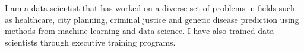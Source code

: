 

\begin{cvparagraph}

I am a data scientist that has worked on a diverse set of problems in fields such as healthcare, city planning, criminal justice
   and genetic disease prediction using methods from machine learning and data science. I have also trained data scientists through executive training programs.

\end{cvparagraph}
